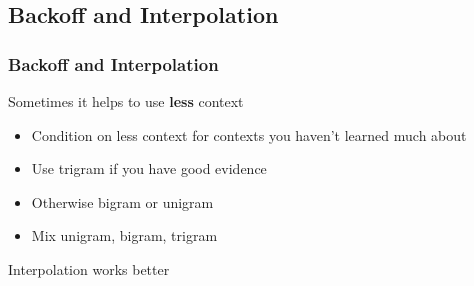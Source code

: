 \documentclass[13.5pt,aspecratio=169]{beamer}
\begin{document}
\subsection{Backoff and Interpolation}
\begin{frame}
    \onehalfspacing
        \frametitle{Backoff and Interpolation}
        {\Large Sometimes it helps to use \textbf{less} context}
        \begin{itemize}
            \item {Condition on less context for contexts you haven’t learned much about}
    
        \end{itemize}
        
        \begin{minipage}{0.5\textwidth}
            \begin{block}{}
                \begin{itemize}
                    \item Use trigram if you have good evidence
                    \item Otherwise bigram or unigram
                \end{itemize}
            \end{block}
        \end{minipage} \hspace{10}
        \begin{minipage}{0.45\textwidth}
            \begin{block}{}
                \begin{itemize}
                    \item Mix unigram, bigram, trigram \\ \vspace{5}
                    \hphantom{fndfjndnjfjnd}
                \end{itemize}
            \end{block}
        \end{minipage}
    
        \bigskip

        \begin{minipage}{0.4\textwidth}
            \begin{block}{}
                Interpolation works better
            \end{block}
        \end{minipage}
       
    \end{frame}
\end{document}
